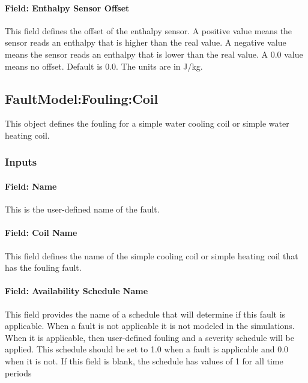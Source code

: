 \paragraph{Field: Enthalpy Sensor Offset}\label{field-enthalpy-sensor-offset-1}

This field defines the offset of the enthalpy sensor. A positive value means the sensor reads an enthalpy that is higher than the real value. A negative value means the sensor reads an enthalpy that is lower than the real value. A 0.0 value means no offset. Default is 0.0. The units are in J/kg.

\subsection{FaultModel:Fouling:Coil}\label{faultmodelfoulingcoil}

This object defines the fouling for a simple water cooling coil or simple water heating coil.

\subsubsection{Inputs}\label{inputs-5-018}

\paragraph{Field: Name}\label{field-name-5-014}

This is the user-defined name of the fault.

\paragraph{Field: Coil Name}\label{field-coil-name-001}

This field defines the name of the simple cooling coil or simple heating coil that has the fouling fault.

\paragraph{Field: Availability Schedule Name}\label{field-availability-schedule-name-5-002}

This field provides the name of a schedule that will determine if this fault is applicable. When a fault is not applicable it is not modeled in the simulations. When it is applicable, then user-defined fouling and a severity schedule will be applied. This schedule should be set to 1.0 when a fault is applicable and 0.0 when it is not. If this field is blank, the schedule has values of 1 for all time periods

